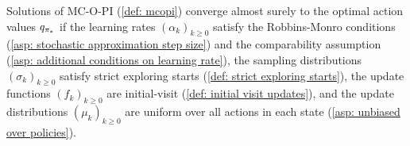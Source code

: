 \begin{proposition}
\label{thm: convergence mcopi uniform}
    Solutions of MC-O-PI (\autoref{def: mcopi}) converge almost surely to the optimal action values $q_{{\pi}_*}$
    if
    the learning rates $(\alpha_k)_{k \ge 0}$ satisfy the Robbins-Monro conditions (\autoref{asp: stochastic approximation step size}) and the comparability assumption (\autoref{asp: additional conditions on learning rate}),
    the sampling distributions $(\sigma_k)_{k \ge 0}$ satisfy strict exploring starts (\autoref{def: strict exploring starts}),
    the update functions $(f_k)_{k \ge 0}$ are initial-visit (\autoref{def: initial visit updates}),
    and the update distributions $(\mu_k)_{k \ge 0}$ are uniform over all actions in each state (\autoref{asp: unbiased over policies}).
\end{proposition}
\vspace{-0.8cm}
